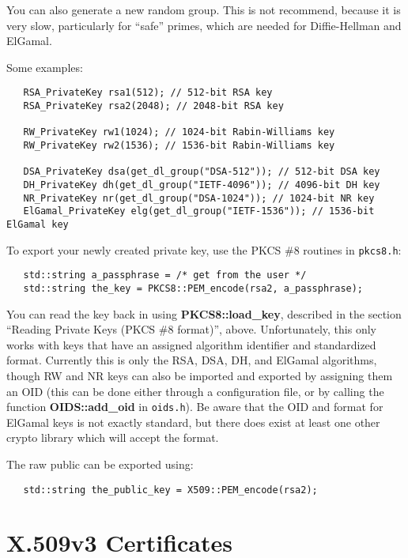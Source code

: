 \documentclass{article}
\newcommand{\filename}[1]{\texttt{#1}}
\newcommand{\function}[1]{\textbf{#1}}
\begin{document}
You can also generate a new random group. This is not recommend, because it is
very slow, particularly for ``safe'' primes, which are needed for
Diffie-Hellman and ElGamal.

Some examples:

\begin{verbatim}
   RSA_PrivateKey rsa1(512); // 512-bit RSA key
   RSA_PrivateKey rsa2(2048); // 2048-bit RSA key

   RW_PrivateKey rw1(1024); // 1024-bit Rabin-Williams key
   RW_PrivateKey rw2(1536); // 1536-bit Rabin-Williams key

   DSA_PrivateKey dsa(get_dl_group("DSA-512")); // 512-bit DSA key
   DH_PrivateKey dh(get_dl_group("IETF-4096")); // 4096-bit DH key
   NR_PrivateKey nr(get_dl_group("DSA-1024")); // 1024-bit NR key
   ElGamal_PrivateKey elg(get_dl_group("IETF-1536")); // 1536-bit ElGamal key
\end{verbatim}

To export your newly created private key, use the PKCS \#8 routines in
\filename{pkcs8.h}:

\begin{verbatim}
   std::string a_passphrase = /* get from the user */
   std::string the_key = PKCS8::PEM_encode(rsa2, a_passphrase);
\end{verbatim}

You can read the key back in using \function{PKCS8::load\_key}, described in
the section ``Reading Private Keys (PKCS \#8 format)'', above. Unfortunately,
this only works with keys that have an assigned algorithm identifier and
standardized format. Currently this is only the RSA, DSA, DH, and ElGamal
algorithms, though RW and NR keys can also be imported and exported by
assigning them an OID (this can be done either through a configuration file, or
by calling the function \function{OIDS::add\_oid} in \filename{oids.h}). Be
aware that the OID and format for ElGamal keys is not exactly standard, but
there does exist at least one other crypto library which will accept the
format.

The raw public can be exported using:

\begin{verbatim}
   std::string the_public_key = X509::PEM_encode(rsa2);
\end{verbatim}

\pagebreak

\section{X.509v3 Certificates}
\end{document}
